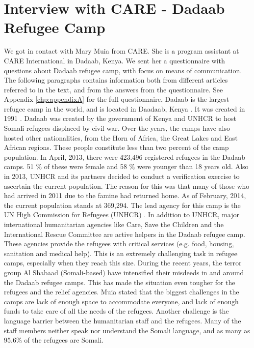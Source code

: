 \section{Interview with CARE - Dadaab Refugee Camp}
We got in contact with Mary Muia from CARE. She is a program assistant at CARE International in Dadaab, Kenya. We sent her a questionnaire with questions about Dadaab refugee camp, with focus on means of communication. The following paragraphs contains information both from different articles referred to in the text, and from the answers from the questionnaire. See Appendix \ref{chp:appendixA} for the full questionnaire. Dadaab is the largest refugee camp in the world, and is located in Daadaab, Kenya \cite{dadaab}. It was created in 1991 \cite{dadaabcare}. Dadaab was created by the government of Kenya and UNHCR to host Somali refugees displaced by civil war. Over the years, the camps have also hosted other nationalities, from the Horn of Africa, the Great Lakes and East African regions. These people constitute less than two percent of the camp population. In April, 2013, there were 423,496 registered refugees in the Dadaab camps. 51 \% of these were female and 58 \% were younger than 18 years old. Also in 2013, UNHCR and its partners decided to conduct a verification exercise to ascertain the current population. The reason for this was that many of those who had arrived in 2011 due to the famine had returned home. As of February, 2014, the current population stands at 369,294. The lead agency for this camp is the UN High Commission for Refugees (UNHCR) \cite{dadaab}. In addition to UNHCR, major international humanitarian agencies like Care, Save the Children and the International Rescue Committee are active helpers in the Dadaab refugee camp. These agencies provide the refugees with critical services (e.g. food, housing, sanitation and medical help). This is an extremely challenging task in refugee camps, especially when they reach this size. During the recent years, the terror group Al Shabaad (Somali-based) have intensified their misdeeds in and around the Dadaab refugee camps. This has made the situation even tougher for the refugees and the relief agencies. 
Muia stated that the biggest challenges in the camps are lack of enough space to accommodate everyone, and lack of enough funds to take care of all the needs of the refugees. Another challenge is the language barrier between the humanitarian staff and the refugees. Many of the staff members neither speak nor understand the Somali language, and as many as 95.6\% of the refugees are Somali. 

